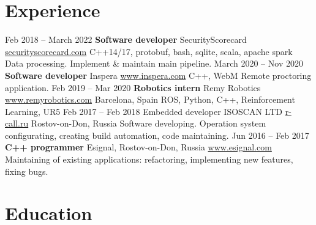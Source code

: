 \documentclass[11pt,a4paper]{moderncv}
\newcommand{\EngRus}[2]{#1}
\newcommand{\BirthPlaceOfValour}{\EngRus{Rostov-on-Don, Russia}{Ростов-на-Дону, Россия}}
\newcommand{\SunshinePalace}{\EngRus{Barcelona, Spain}{Барселона, Испания}}
\begin{document}
\maketitle

\section{\EngRus{Experience}{Опыт}}
\cventry
  {\EngRus{Feb}{Фев} 2018 -- \EngRus{March}{Мар} 2022}
  {\bfseries \EngRus{Software developer}{Разработчик ПО}}
  {\newline SecurityScorecard \url{securityscorecard.com}}{}
  {\newline{}C++14/17, protobuf, bash, sqlite, scala, apache spark}
  {\EngRus{Data processing. Implement \& maintain main pipeline.}{Обработка данных. Разработка и поддержка основного пайплайна.}}
\cventry
  {\EngRus{March}{Мар} 2020 -- \EngRus{Nov}{Ноя} 2020}
  {\bfseries \EngRus{Software developer}{Разработчик ПО}}
  {\newline Inspera \url{www.inspera.com}} {}
  {\newline{}C++, WebM} {\EngRus{Remote proctoring application.}{Приложение для дистанционной сдачи экзаменов.}}
\cventry
  {\EngRus{Feb}{Фев} 2019 -- \EngRus{Mar}{Мар} 2020}
  {\bfseries \EngRus{Robotics intern}{Стажёр робототехники}}
  {\newline Remy Robotics \url{www.remyrobotics.com}} { \SunshinePalace }
  {\newline{}ROS, Python, C++, Reinforcement Learning, UR5} {}
\cventry
  {\EngRus{Feb}{Фев} 2017 -- \EngRus{Feb}{Фев} 2018}
  {\EngRus{Embedded developer}{Разработчик встраиваемого ПО}}
  {\EngRus{ISOSCAN LTD}{ООО "Изоскан"} \url{r-call.ru}}
  {\BirthPlaceOfValour}{}
  {\EngRus{Software developing. Operation system configurating, creating build automation, code maintaining.}{Разработка программного обеспечения. Настройка операционных систем, систем сборки, поддержка текущего кода.}}
\cventry
  {\EngRus{Jun}{Июн} 2016 -- \EngRus{Feb}{Фев} 2017}
  {\bfseries \EngRus{C++ programmer}{C++ программист}}
  {Esignal, \BirthPlaceOfValour}
  {\newline{}\url{www.esignal.com}}{}
  {\EngRus{Maintaining of existing applications: refactoring, implementing new features, fixing bugs.}{Поддержка текущего кода: рефакторинг, исправление багов и добавление новых возможностей.}}
\pagebreak

\section{\EngRus{Education}{Образование}}
\end{document}
